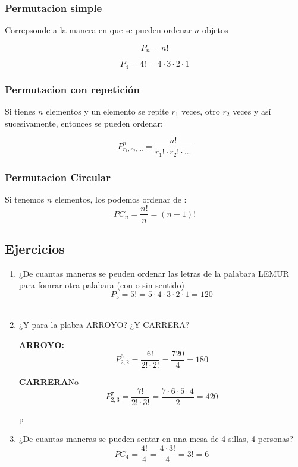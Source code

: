 \documentclass[12pt, letterpaper]{article}
\begin{document}
\subsubsection{Permutacion simple} Correpsonde a la manera en que se pueden ordenar $n$ objetos

    \begin{minipage}{0.35\textwidth}
        \centering
        \[ P_n = n! \]
    \end{minipage}
    \hfill
    \begin{minipage}{0.55\textwidth}
        \centering
        \[ P_4 = 4!= 4 \cdot 3 \cdot 2 \cdot 1 \]
    \end{minipage}

\subsubsection{Permutacion con repetición} Si tienes $n$ elementos y un elemento se repite $r_1$ veces, otro $r_2$ veces y así sucesivamente, entonces se pueden ordenar:

\[ P_{r_1, r_2, ...}^n = \frac{n!}{r_1! \cdot r_2! \cdot ...} \]


\subsubsection{Permutacion Circular} Si tenemos $n$ elementos, los podemos ordenar de :
\[ PC_n = \frac{n!}{n} = (n-1)! \]

\subsection{Ejercicios}

\begin{enumerate}[label=\alph*.)]
    \item ¿De cuantas maneras se peuden ordenar las letras de la palabara LEMUR  para fomrar otra palabara (con o sin sentido)
        \[ P_5 = 5! = 5 \cdot 4 \cdot 3 \cdot 2 \cdot 1 = 120 \] \\

    \item ¿Y para la plabra ARROYO? ¿Y CARRERA?

        \begin{minipage}{0.45\textwidth}
            \centering
            \textbf{ARROYO:}
            \[ P_{2, 2}^6 = \frac{6!}{2! \cdot 2!} = \frac{720}{4} = 180 \]
        \end{minipage}
        \hfill
        \begin{minipage}{0.45\textwidth}
            \centering
            \textbf{CARRERA}No
            \[ P_{2,3}^7 = \frac{7!}{2! \cdot 3!} = \frac{7\cdot 6 \cdot 5 \cdot 4}{2} = 420 \]
        \end{minipage}
        
        \phantom p \\

    \item ¿De cuantas maneras se pueden sentar en una mesa de 4 sillas, 4 personas?
        \[ PC_4 = \frac{4!}{4} =\frac{4 \cdot 3!}{4} = 3! = 6 \]
\end{enumerate}
\newpage
\end{document}
